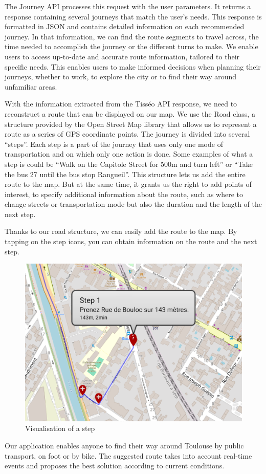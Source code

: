 The Journey API processes this request with the user parameters. It returns a response containing several journeys that match the user's needs. This response is formatted in JSON and contains detailed information on each recommended journey. In that information, we can find the route segments to travel across, the time needed to accomplish the journey or the different turns to make. We enable users to access up-to-date and accurate route information, tailored to their specific needs. This enables users to make informed decisions when planning their journeys, whether to work, to explore the city or to find their way around unfamiliar areas.\newline

With the information extracted from the Tisséo API response, we need to reconstruct a route that can be displayed on our map. We use the Road class, a structure provided by the Open Street Map library that allows us to represent a route as a series of GPS coordinate points. The journey is divided into several “steps”. Each step is a part of the journey that uses only one mode of transportation and on which only one action is done. Some examples of what a step is could be “Walk on the Capitole Street for 500m and turn left” or “Take the bus 27 until the bus stop Rangueil”. This structure lets us add the entire route to the map. But at the same time, it grants us the right to add points of interest, to specify additional information about the route, such as where to change streets or transportation mode but also the duration and the length of the next step.\newline

Thanks to our road structure, we can easily add the route to the map. By tapping on the step icons, you can obtain information on the route and the next step.\newline

\begin{figure}[h]
    \centering
    \includegraphics[scale=0.2]{img/step_cut.png}
    \caption{Visualisation of a step}
    \label{fig:StepVisualisation}
\end{figure}

Our application enables anyone to find their way around Toulouse by public transport, on foot or by bike. The suggested route takes into account real-time events and proposes the best solution according to current conditions.\newline
